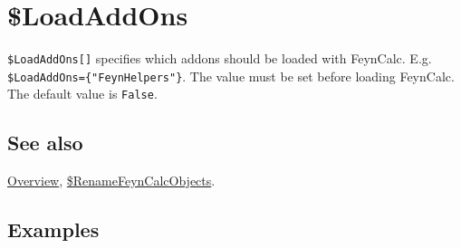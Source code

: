 \documentclass[../FeynCalcManual.tex]{subfiles}
\begin{document}
\hypertarget{loadaddons}{%
\section{\$LoadAddOns}\label{loadaddons}}

\texttt{\$LoadAddOns[\allowbreak{}]} specifies which addons should be
loaded with FeynCalc. E.g.
\texttt{\$LoadAddOns=\{\allowbreak{}"FeynHelpers"\}}. The value must be
set before loading FeynCalc. The default value is \texttt{False}.

\subsection{See also}

\hyperlink{toc}{Overview},
\hyperlink{renamefeyncalcobjects}{\$RenameFeynCalcObjects}.

\subsection{Examples}
\end{document}
